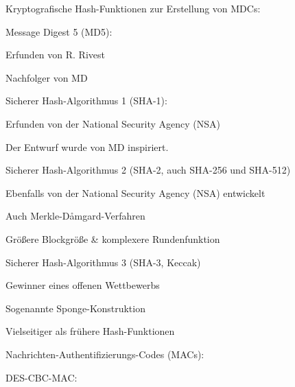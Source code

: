 \documentclass[a4paper]{article}
\begin{document}
\begin{multicols}{3}
      \begin{itemize*}
            \item Kryptografische Hash-Funktionen zur Erstellung von MDCs:
            \begin{itemize*}
                  \item Message Digest 5 (MD5):
                  \begin{itemize*}
                        \item Erfunden von R. Rivest
                        \item Nachfolger von MD
                  \end{itemize*}
                  \item Sicherer Hash-Algorithmus 1 (SHA-1):
                  \begin{itemize*}
                        \item Erfunden von der National Security Agency (NSA)
                        \item Der Entwurf wurde von MD inspiriert.
                  \end{itemize*}
                  \item Sicherer Hash-Algorithmus 2 (SHA-2, auch SHA-256 und SHA-512)
                  \begin{itemize*}
                        \item Ebenfalls von der National Security Agency (NSA) entwickelt
                        \item Auch Merkle-Dåmgard-Verfahren
                        \item Größere Blockgröße \& komplexere Rundenfunktion
                  \end{itemize*}
                  \item Sicherer Hash-Algorithmus 3 (SHA-3, Keccak)
                  \begin{itemize*}
                        \item Gewinner eines offenen Wettbewerbs
                        \item Sogenannte Sponge-Konstruktion
                        \item Vielseitiger als frühere Hash-Funktionen
                  \end{itemize*}
            \end{itemize*}
            \item Nachrichten-Authentifizierungs-Codes (MACs):
            \begin{itemize*}
                  \item DES-CBC-MAC:

\end{itemize*}
\end{itemize*}
\end{multicols}
\end{document}
